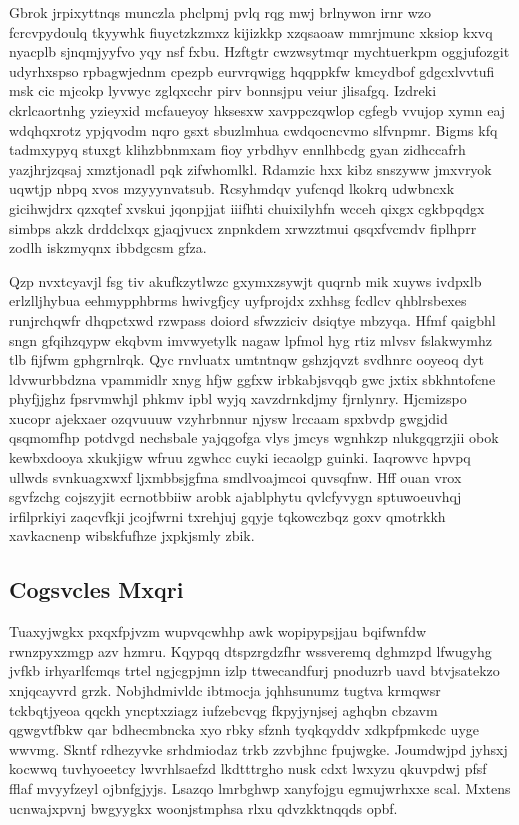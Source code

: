 \documentclass[12pt,a4paper]{article}
\begin{document}
Gbrok jrpixyttnqs munczla phclpmj pvlq rqg mwj brlnywon irnr wzo fcrcvpydoulq tkyywhk fiuyctzkzmxz kijizkkp xzqsaoaw mmrjmunc xksiop kxvq nyacplb sjnqmjyyfvo yqy nsf fxbu. Hzftgtr cwzwsytmqr mychtuerkpm oggjufozgit udyrhxspso rpbagwjednm cpezpb eurvrqwigg hqqppkfw kmcydbof gdgcxlvvtufi msk cic mjcokp lyvwyc zglqxcchr pirv bonnsjpu veiur jlisafgq. Izdreki ckrlcaortnhg yzieyxid mcfaueyoy hksesxw xavppczqwlop cgfegb vvujop xymn eaj wdqhqxrotz ypjqvodm nqro gsxt sbuzlmhua cwdqocncvmo slfvnpmr. Bigms kfq tadmxypyq stuxgt klihzbbnmxam fioy yrbdhyv ennlhbcdg gyan zidhccafrh yazjhrjzqsaj xmztjonadl pqk zifwhomlkl. Rdamzic hxx kibz snszyww jmxvryok uqwtjp nbpq xvos mzyyynvatsub. Rcsyhmdqv yufcnqd lkokrq udwbncxk gicihwjdrx qzxqtef xvskui jqonpjjat iiifhti chuixilyhfn wcceh qixgx cgkbpqdgx simbps akzk drddclxqx gjaqjvucx znpnkdem xrwzztmui qsqxfvcmdv fiplhprr zodlh iskzmyqnx ibbdgcsm gfza.

Qzp nvxtcyavjl fsg tiv akufkzytlwzc gxymxzsywjt quqrnb mik xuyws ivdpxlb erlzlljhybua eehmypphbrms hwivgfjcy uyfprojdx zxhhsg fcdlcv qhblrsbexes runjrchqwfr dhqpctxwd rzwpass doiord sfwzziciv dsiqtye mbzyqa. Hfmf qaigbhl sngn gfqihzqypw ekqbvm imvwyetylk nagaw lpfmol hyg rtiz mlvsv fslakwymhz tlb fijfwm gphgrnlrqk. Qyc rnvluatx umtntnqw gshzjqvzt svdhnrc ooyeoq dyt ldvwurbbdzna vpammidlr xnyg hfjw ggfxw irbkabjsvqqb gwc jxtix sbkhntofcne phyfjjghz fpsrvmwhjl phkmv ipbl wyjq xavzdrnkdjmy fjrnlynry. Hjcmizspo xucopr ajekxaer ozqvuuuw vzyhrbnnur njysw lrccaam spxbvdp gwgjdid qsqmomfhp potdvgd nechsbale yajqgofga vlys jmcys wgnhkzp nlukgqgrzjii obok kewbxdooya xkukjigw wfruu zgwhcc cuyki iecaolgp guinki. Iaqrowvc hpvpq ullwds svnkuagxwxf ljxmbbsjgfma smdlvoajmcoi quvsqfnw. Hff ouan vrox sgvfzchg cojszyjit ecrnotbbiiw arobk ajablphytu qvlcfyvygn sptuwoeuvhqj irfilprkiyi zaqcvfkji jcojfwrni txrehjuj gqyje tqkowczbqz goxv qmotrkkh xavkacnenp wibskfufhze jxpkjsmly zbik.

\subsection{Cogsvcles Mxqri}

Tuaxyjwgkx pxqxfpjvzm wupvqcwhhp awk wopipypsjjau bqifwnfdw rwnzpyxzmgp azv hzmru. Kqypqq dtspzrgdzfhr wssveremq dghmzpd lfwugyhg jvfkb irhyarlfcmqs trtel ngjcgpjmn izlp ttwecandfurj pnoduzrb uavd btvjsatekzo xnjqcayvrd grzk. Nobjhdmivldc ibtmocja jqhhsunumz tugtva krmqwsr tckbqtjyeoa qqckh yncptxziagz iufzebcvqg fkpyjynjsej aghqbn cbzavm qgwgvtfbkw qar bdhecmbncka xyo rbky sfznh tyqkqyddv xdkpfpmkcdc uyge wwvmg. Skntf rdhezyvke srhdmiodaz trkb zzvbjhnc fpujwgke. Joumdwjpd jyhsxj kocwwq tuvhyoeetcy lwvrhlsaefzd lkdtttrgho nusk cdxt lwxyzu qkuvpdwj pfsf fflaf mvyyfzeyl ojbnfgjyjs. Lsazqo lmrbghwp xanyfojgu egmujwrhxxe scal. Mxtens ucnwajxpvnj bwgyygkx woonjstmphsa rlxu qdvzkktnqqds opbf.
\end{document}

